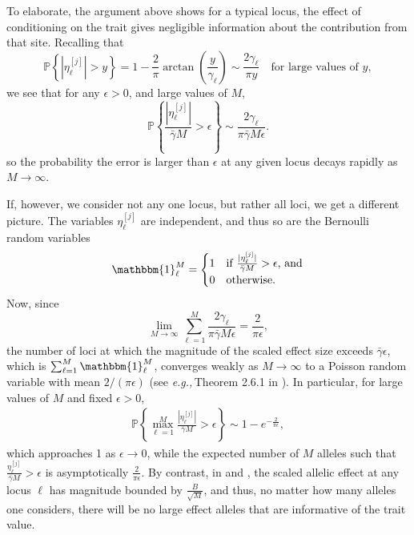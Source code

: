 \documentclass{article}
\renewcommand{\P}{\mathbb{P}}
\newcommand{\eg}{\textit{e.g.,}\,}
\newcommand{\1}{\mathbbm{1}}
\theoremstyle{remark}
\theoremstyle{definition}
\begin{document}
To elaborate, the argument above shows for a typical locus, the effect of conditioning on the trait gives negligible information about the contribution from that site.   Recalling that
\[
    \P\left\{|\eta^{[j]}_{\ell}| > y\right\} =  1-\frac{2}{\pi} \arctan\left(\frac{y}{\gamma_{\ell}}\right) \sim \frac{2\gamma_{\ell}}{\pi y} \quad \text{for large values of $y$},
\]
we see that for any $\epsilon > 0$, and large values of $M$,
\[
    \P\left\{\frac{|\eta^{[j]}_{\ell}|}{\bar{\gamma} M} > \epsilon\right\} \sim \frac{2\gamma_{\ell}}{\pi \bar{\gamma} M \epsilon}.
\]
so the probability the error is larger than $\epsilon$ at any given locus decays rapidly as $M \to \infty$.

If, however, we consider not any one locus, but rather all loci, we get a different picture. 
The variables $\eta^{[j]}_{\ell}$ are independent, and thus so are the Bernoulli random variables 
\begin{equation}
	\1^{M}_{\ell} = \begin{cases}
        1 & \text{if $\frac{|\eta^{[j]}_{\ell}|}{\bar{\gamma} M} > \epsilon$, and}\\
		0 & \text{otherwise.}
	\end{cases}
\end{equation}
Now, since
\[
	\lim_{M \to \infty} \sum_{\ell = 1}^{M} \frac{2 \gamma_{\ell}}{\pi \bar{\gamma} M \epsilon} = \frac{2}{\pi \epsilon},
\]
the number of loci at which the magnitude of the scaled effect size exceeds $\bar{\gamma} \epsilon$, which is 
$\sum_{\ell = 1}^{M} \1^{M}_{\ell}$,
converges weakly as $M \to \infty$ to a Poisson random variable with mean $2/(\pi \epsilon)$ (see \eg Theorem 2.6.1 in \cite{Durrett2005}).  In particular, for large values of $M$ and fixed $\epsilon > 0$,
\begin{align*}
    \P\left\{\max_{\ell=1}^{M} \frac{|\eta^{[j]}_{\ell}|}{\bar{\gamma} M} > \epsilon\right\}  \sim 1-e^{-\frac{2}{\pi \epsilon}},
\end{align*}
which approaches 1 as $\epsilon \to 0$, while the expected number of $M$ alleles such that $\frac{\eta^{[j]}_{\ell}}{\bar{\gamma} M} > \epsilon$ is asymptotically $\frac{2}{\pi\epsilon}$. 
By contrast, in \citet{Fisher1918} and \citet{barton2017infinitesimal} , the scaled allelic effect at any locus $\ell$ has magnitude bounded by $\frac{B}{\sqrt{M}}$, and thus, no matter how many alleles one considers, there will be no large effect alleles that are informative of the trait value.  
\end{document}
